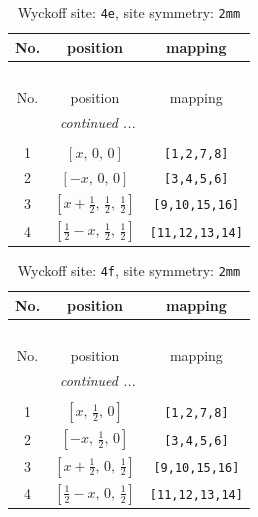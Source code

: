 \documentclass[fleqn,8pt]{jsarticle}
\begin{document}
\begin{longtable}{ccc}
\caption{Wyckoff site: {\tt 4e}, site symmetry: {\tt 2mm}}
 \\
 \hline \hline
No. & position & mapping \\ \hline \endfirsthead

\multicolumn{2}{l}{\tablename\ \thetable{}} \\
 \hline \hline
No. & position & mapping \\ \hline \endhead

 \hline \hline
\multicolumn{2}{r}{\footnotesize\it continued ...} \\ \endfoot

 \hline \hline
\multicolumn{2}{r}{} \\ \endlastfoot

1 & $\left[ x,\, 0,\, 0 \right]$ & {\tt [1,2,7,8]} \\ \hline
2 & $\left[ - x,\, 0,\, 0 \right]$ & {\tt [3,4,5,6]} \\ \hline
3 & $\left[ x + \frac{1}{2},\, \frac{1}{2},\, \frac{1}{2} \right]$ & {\tt [9,10,15,16]} \\ \hline
4 & $\left[ \frac{1}{2} - x,\, \frac{1}{2},\, \frac{1}{2} \right]$ & {\tt [11,12,13,14]} \\
\end{longtable}
\renewcommand{\arraystretch}{1.2}
\begin{longtable}{ccc}
\caption{Wyckoff site: {\tt 4f}, site symmetry: {\tt 2mm}}
 \\
 \hline \hline
No. & position & mapping \\ \hline \endfirsthead

\multicolumn{2}{l}{\tablename\ \thetable{}} \\
 \hline \hline
No. & position & mapping \\ \hline \endhead

 \hline \hline
\multicolumn{2}{r}{\footnotesize\it continued ...} \\ \endfoot

 \hline \hline
\multicolumn{2}{r}{} \\ \endlastfoot

1 & $\left[ x,\, \frac{1}{2},\, 0 \right]$ & {\tt [1,2,7,8]} \\ \hline
2 & $\left[ - x,\, \frac{1}{2},\, 0 \right]$ & {\tt [3,4,5,6]} \\ \hline
3 & $\left[ x + \frac{1}{2},\, 0,\, \frac{1}{2} \right]$ & {\tt [9,10,15,16]} \\ \hline
4 & $\left[ \frac{1}{2} - x,\, 0,\, \frac{1}{2} \right]$ & {\tt [11,12,13,14]} \\
\end{longtable}
\end{document}
